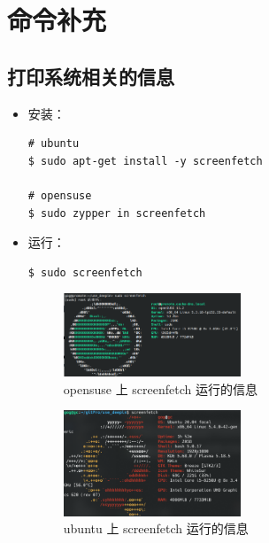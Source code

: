 
\chapter{命令补充}


\section{打印系统相关的信息}
\begin{itemize}
\item 安装：
\begin{lstlisting}
# ubuntu 
$ sudo apt-get install -y screenfetch 

# opensuse 
$ sudo zypper in screenfetch
\end{lstlisting}

\item 运行：
\begin{lstlisting}
$ sudo screenfetch
\end{lstlisting}

\begin{figure}[htp]  
    \centering
    \includegraphics[width=0.5\textwidth]{./img/screenfetch/opensuse.png}
    \caption{opensuse  上 screenfetch 运行的信息} %
    \label{opensuse} %
\end{figure}

\begin{figure}[htp]  
    \centering
    \includegraphics[width=0.5\textwidth]{./img/screenfetch/ubuntu.png}
    \caption{ubuntu 上 screenfetch 运行的信息}
    \label{ubuntu}
\end{figure}

\end{itemize}


